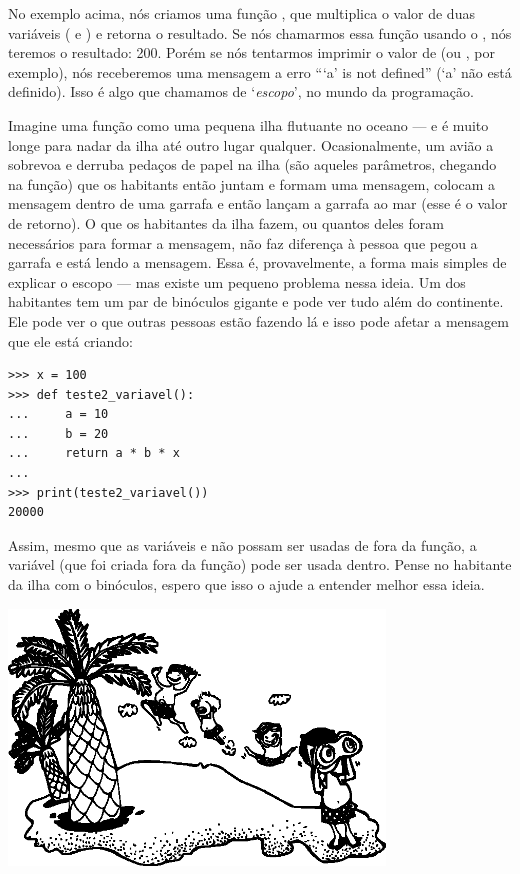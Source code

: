 No exemplo acima, nós criamos uma função , que multiplica o valor de duas variáveis ( e ) e retorna o resultado. Se nós chamarmos essa função usando o , nós teremos o resultado: 200. Porém se nós tentarmos imprimir o valor de  (ou , por exemplo), nós receberemos uma mensagem a erro ```a' is not defined'' (`a' não está definido). Isso é algo que chamamos de `\emph{escopo}', no mundo da programação.
\par
Imagine uma função como uma pequena ilha flutuante no oceano --- e é muito longe para nadar da ilha até outro lugar qualquer. Ocasionalmente, um avião a sobrevoa e derruba pedaços de papel na ilha (são aqueles parâmetros, chegando na função) que os habitants então juntam e formam uma mensagem, colocam a mensagem dentro de uma garrafa e então lançam a garrafa ao mar (esse é o valor de retorno). O que os habitantes da ilha fazem, ou quantos deles foram necessários para formar a mensagem, não faz diferença à pessoa que pegou a garrafa e está lendo a mensagem. Essa é, provavelmente, a forma mais simples de explicar o escopo --- mas existe um pequeno problema nessa ideia. Um dos habitantes tem um par de binóculos gigante e pode ver tudo além do continente. Ele pode ver o que outras pessoas estão fazendo lá e isso pode afetar a mensagem que ele está criando:

\begin{listing}
\begin{verbatim}
>>> x = 100
>>> def teste2_variavel():
...     a = 10
...     b = 20
...     return a * b * x
... 
>>> print(teste2_variavel())
20000
\end{verbatim}
\end{listing}

Assim, mesmo que as variáveis  e  não possam ser usadas de fora da função, a variável  (que foi criada fora da função) pode ser usada dentro. Pense no habitante da ilha com o binóculos, espero que isso o ajude a entender melhor essa ideia.

\begin{center}
\includegraphics*[width=100mm]{eps/islanders.eps}
\end{center}

